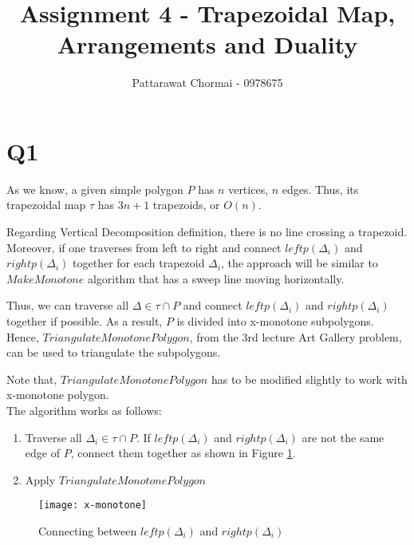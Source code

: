 \documentclass[12pt]{article}
\begin{document}
\title{Assignment 4 - Trapezoidal Map, Arrangements and Duality }
\author{
	Pattarawat Chormai - 0978675 \\
}
\maketitle

\section*{Q1}

As we know, a given simple polygon $P$ has $n$ vertices, $n$ edges. Thus, its trapezoidal
map $\tau$ has $3n+1$ trapezoids, or $O(n)$.

Regarding Vertical Decomposition definition, there is no line crossing a
trapezoid. Moreover, if one traverses from left to right and connect $leftp(\Delta_i)$
and $rightp(\Delta_i)$ together for each trapezoid $\Delta_i$, the approach will be similar
to $MakeMonotone$ algorithm that has a sweep line moving horizontally.


Thus, we can traverse all $\Delta \in \tau \cap P$ and connect $leftp(\Delta_i)$ and
$rightp(\Delta_i)$ together if possible. As a result, $P$ is divided into x-monotone
subpolygons. Hence, $TriangulateMonotonePolygon$, from the 3rd lecture Art Gallery problem,
can be used to triangulate the subpolygons.


Note that, $TriangulateMonotonePolygon$ has to
be modified slightly to work with x-monotone polygon. \\


The algorithm works as follows:

\begin{enumerate}
    \item Traverse all $\Delta_i \in \tau \cap P$. If $leftp(\Delta_i)$
    and $rightp(\Delta_i)$ are not the same edge of $P$, connect them together
    as shown in Figure \ref{fig:x-monotone}.
    \item Apply $TriangulateMonotonePolygon$
\end{enumerate}

\begin{center}
    \label{figure1}
    \begin{figure}[h]
    \centering
    \texttt{[image: x-monotone]}\\
    \caption{Connecting between $leftp(\Delta_i)$ and $rightp(\Delta_i)$ } \label{fig:x-monotone}
    \end{figure}
\end{center}
\end{document}
